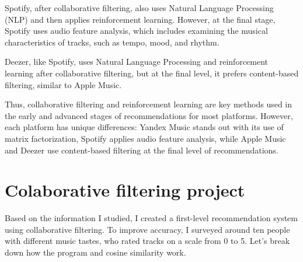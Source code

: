 \documentclass[12pt,a4paper]{article}
\begin{document}
Spotify, after collaborative filtering, also uses Natural Language Processing (NLP) and then applies reinforcement learning. However, at the final stage, Spotify uses audio feature analysis, which includes examining the musical characteristics of tracks, such as tempo, mood, and rhythm.

Deezer, like Spotify, uses Natural Language Processing and reinforcement learning after collaborative filtering, but at the final level, it prefers content-based filtering, similar to Apple Music.

Thus, collaborative filtering and reinforcement learning are key methods used in the early and advanced stages of recommendations for most platforms. However, each platform has unique differences: Yandex Music stands out with its use of matrix factorization, Spotify applies audio feature analysis, while Apple Music and Deezer use content-based filtering at the final level of recommendations.

\section{Colaborative filtering project}

Based on the information I studied, I created a first-level recommendation system using collaborative filtering. To improve accuracy, I surveyed around ten people with different music tastes, who rated tracks on a scale from 0 to 5. Let's break down how the program and cosine similarity work.
\end{document}
